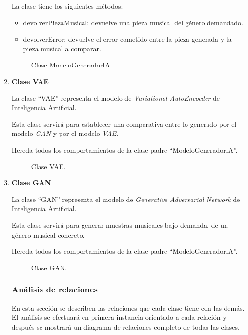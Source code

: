 \begin{enumerate}
  La clase tiene los siguientes métodos:

  \begin{itemize}
      \item devolverPiezaMusical: devuelve una pieza musical del género demandado.
      \item devolverError: devuelve el error cometido entre la pieza generada y la pieza musical a comparar.
  \end{itemize}

  \begin{figure}[H]
    \centering
    
    \caption{Clase ModeloGeneradorIA.}
  \end{figure}


  \item \textbf{Clase VAE}

  La clase ``VAE'' representa el modelo de \emph{Variational AutoEncocder} de Inteligencia Artificial.

  Esta clase servirá para establecer una comparativa entre lo generado por el modelo \emph{GAN} y por el modelo \emph{VAE}.

  Hereda todos los comportamientos de la clase padre ``ModeloGeneradorIA''.

  \begin{figure}[H]
    \centering
    
    \caption{Clase VAE.}
  \end{figure}

  \item \textbf{Clase GAN}

  La clase ``GAN'' representa el modelo de \emph{Generative Adversarial Network} de Inteligencia Artificial.

  Esta clase servirá para generar muestras musicales bajo demanda, de un género musical concreto.

  Hereda todos los comportamientos de la clase padre ``ModeloGeneradorIA''.

  \begin{figure}[H]
    \centering
    
    \caption{Clase GAN.}
  \end{figure}

  \subsubsection{Análisis de relaciones}

  En esta sección se describen las relaciones que cada clase tiene con las demás. El análisis se efectuará en primera instancia orientado a cada relación y después se mostrará un diagrama de relaciones completo de todas las clases.


\end{enumerate}
